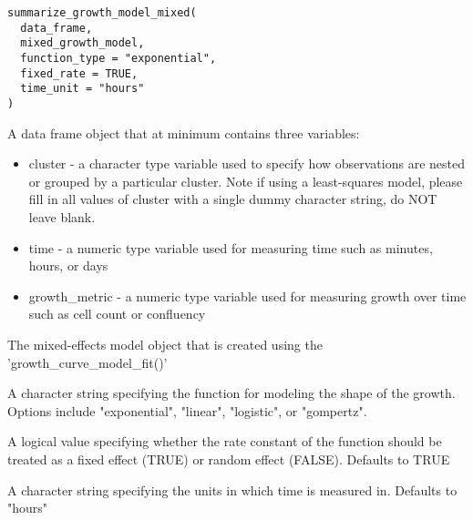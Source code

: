 \documentclass[a4paper]{book}
\begin{document}
%
\begin{Usage}
\begin{verbatim}
summarize_growth_model_mixed(
  data_frame,
  mixed_growth_model,
  function_type = "exponential",
  fixed_rate = TRUE,
  time_unit = "hours"
)
\end{verbatim}
\end{Usage}
%
\begin{Arguments}
\begin{ldescription}
\item[\code{data\_frame}] A data frame object that at minimum contains three
variables:
\begin{itemize}

\item{} cluster - a character type variable used to specify how observations
are nested or grouped by a particular cluster. Note if using a
least-squares model, please fill in all values of cluster with a single
dummy character string, do NOT leave blank.
\item{} time - a numeric type variable used for measuring time such as
minutes, hours, or days
\item{} growth\_metric - a numeric type variable used for measuring growth
over time such as cell count or confluency

\end{itemize}


\item[\code{mixed\_growth\_model}] The mixed-effects model object that is created
using the 'growth\_curve\_model\_fit()'

\item[\code{function\_type}] A character string specifying the function for
modeling the shape of the growth. Options include "exponential", "linear",
"logistic", or "gompertz".

\item[\code{fixed\_rate}] A logical value specifying whether the rate constant
of the function should be treated as a fixed effect (TRUE) or random
effect (FALSE). Defaults to TRUE

\item[\code{time\_unit}] A character string specifying the units in which time is
measured in. Defaults to "hours"
\end{ldescription}
\end{Arguments}
%
\end{document}
